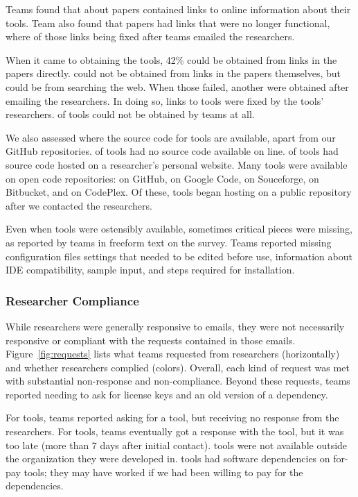 \documentclass[10pt,conference]{IEEEtran}
\begin{document}
Teams found that about \papersWithLinks papers
contained links to online information about their tools.
Team also found that \papersWithLinksDead papers
had links that were no longer functional,
where \papersWithLinksRevived of those links
being fixed after teams emailed the researchers.

When it came to obtaining the tools, 42\%
could be obtained from links in 
the papers directly.
\obtainGoogle could not be obtained from
links in the papers themselves, but could be
from searching the web.
When those failed, another \obtainEmail were 
obtained after emailing the researchers.
In doing so, \contactFixLink links to tools 
were fixed by the tools' researchers.
\obtainNot of tools could not be obtained
by teams at all.

We also assessed where the source code for tools are available,
apart from our GitHub repositories.
\onlineNotAvail of tools had no source code available 
on line.
\onlinePersonalSite of tools had source code hosted
on a researcher's personal website.
Many tools were available on open code repositories:
\onlineGitHub on GitHub, 
\onlineGcode on Google Code,
\onlineSourceforge on Souceforge,
\onlineBitbucket on Bitbucket,
and \onlineCodeplex on CodePlex.
Of these, \contactHosted tools began hosting 
on a public repository after
we contacted the researchers.

Even when tools were ostensibly available,
sometimes critical pieces were missing,
as reported by teams in freeform text on the survey.
Teams reported missing configuration files
settings that needed to be edited before use, 
information about IDE compatibility,
sample input,
and steps required for installation. 

\subsubsection{Researcher Compliance}

While researchers were generally responsive to emails,
they were not necessarily responsive or compliant 
with the requests contained in those emails.
Figure~\ref{fig:requests} lists what teams requested from researchers
(horizontally) and whether researchers complied (colors).
Overall, each kind of request was met with substantial non-response and
non-compliance.
Beyond these requests, teams reported needing to ask for 
license keys and
an old version of a dependency.

For \unworkNoResponseToAsk tools, teams reported asking for a tool,
but receiving no response from the researchers.
For \unworkTooLate tools, teams eventually got a response with the tool, 
but it was  too late (more than 7 days after initial contact).
\unworkInternal tools were not available outside the organization
they were developed in.
\unworkPay tools had software dependencies on for-pay tools; 
they may have worked if we had been willing to pay 
for the dependencies.
\end{document}
